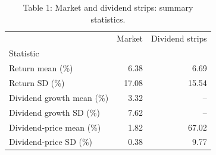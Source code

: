 \begin{table}
\caption{Table 1: Market and dividend strips: summary statistics.}
\label{tab:replication_1}
\begin{tabular}{lrr}
\toprule
 & Market & Dividend strips \\
Statistic &  &  \\
\midrule
Return mean (\%) & 6.38 & 6.69 \\
Return SD (\%) & 17.08 & 15.54 \\
Dividend growth mean (\%) & 3.32 & -- \\
Dividend growth SD (\%) & 7.62 & -- \\
Dividend-price mean (\%) & 1.82 & 67.02 \\
Dividend-price SD (\%) & 0.38 & 9.77 \\
\bottomrule
\end{tabular}
\end{table}

